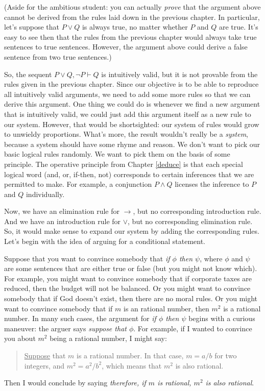 (Aside for the ambitious student: you can actually {\it prove} that
the argument above cannot be derived from the rules laid down in the
previous chapter.  In particular, let's suppose that $P\vee Q$ is
always true, no matter whether $P$ and $Q$ are true.  It's easy to see
then that the rules from the previous chapter would always take true
sentences to true sentences.  However, the argument above could derive
a false sentence from two true sentences.)

So, the sequent $P\vee Q,\neg P\vdash Q$ is intuitively valid, but it
is not provable from the rules given in the previous chapter.  Since
our objective is to be able to reproduce all intuitively valid
arguments, we need to add some more rules so that we can derive this
argument.  One thing we could do is whenever we find a new argument
that is intuitively valid, we could just add this argument itself as a
new rule to our system.  However, that would be shortsighted: our
system of rules would grow to unwieldy proportions.  What's more, the
result wouldn't really be a {\it system}, because a system should have
some rhyme and reason.  We don't want to pick our basic logical rules
randomly.  We want to pick them on the basis of some principle.  The
operative principle from Chapter \ref{deduce} is that each special
logical word (and, or, if-then, not) corresponds to certain inferences
that we are permitted to make.  For example, a conjunction $P\wedge Q$
licenses the inference to $P$ and $Q$ individually.

Now, we have an elimination rule for $\to$, but no corresponding
introduction rule.  And we have an introduction rule for $\vee$, but
no corresponding elimination rule.  So, it would make sense to expand
our system by adding the corresponding rules.  Let's begin with the
idea of arguing for a conditional statement.

Suppose that you want to convince somebody that \textit{if $\phi$ then
  $\psi$}, where $\phi$ and $\psi$ are some sentences that are either true or
false (but you might not know which).  For example, you might want to
convince somebody that if corporate taxes are reduced, then the budget
will not be balanced.  Or you might want to convince somebody that if
God doesn't exist, then there are no moral rules.  Or you might want
to convince somebody that if $m$ is an rational number, then $m^2$ is
a rational number.  In many such cases, the argument for \textit{if
  $\phi$ then $\psi$} begins with a curious maneuver: the arguer says
\textit{suppose that $\phi$}.  For example, if I wanted to convince you
about $m^2$ being a rational number, I might say:
\begin{quote} \underline{Suppose} that $m$ is a rational number.  In
  that case, $m=a/b$ for two integers, and $m^2=a^2/b^2$, which means
  that $m^2$ is also rational.  \end{quote} Then I would conclude by
saying {\it therefore, if $m$ is rational, $m^2$ is also rational}.

